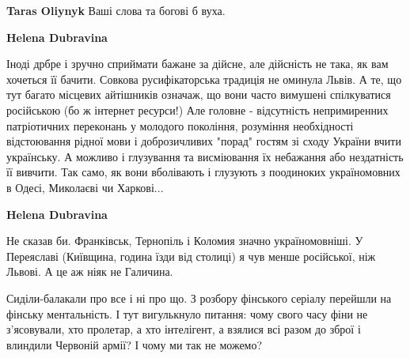 \begin{itemize}
\begin{itemize}
 
\textbf{Taras Oliynyk} Ваші слова та богові б вуха.

 
\textbf{Helena Dubravina} 

Іноді дрбре і зручно сприймати бажане за дійсне, але дійсність не така, як вам
хочеться її бачити. Совкова русифікаторська традиція не оминула Львів. А те, що
тут багато місцевих айтішників означаж, що вони часто вимушені спілкуватися
російською (бо ж інтернет ресурси!) Але головне - відсутність непримиренних
патріотичних переконань у молодого покоління, розуміння необхідності
відстоювання рідної мови і доброзичливих "порад" гостям зі сходу України вчити
українську. А можливо і глузування та висміювання їх небажання або нездатність
її вивчити. Так само, як вони вболівають і глузують з поодиноких україномовних в
Одесі, Миколаєві чи Харкові...


 
\textbf{Helena Dubravina} 

Не сказав би. Франківськ, Тернопіль і Коломия значно україномовніші. У
Переяславі (Київщина, година їзди від столиці) я чув менше російської, ніж
Львові. А це аж ніяк не Галичина.

\end{itemize}

 

Сиділи-балакали про все і ні про що. З розбору фінського серіалу перейшли на
фінську ментальність. І тут вигулькнуло питання: чому свого часу фіни не
з'ясовували, хто пролетар, а хто інтелігент, а взялися всі разом до зброї і
влиндили Червоній армії? І чому ми так не можемо?


\end{itemize}
